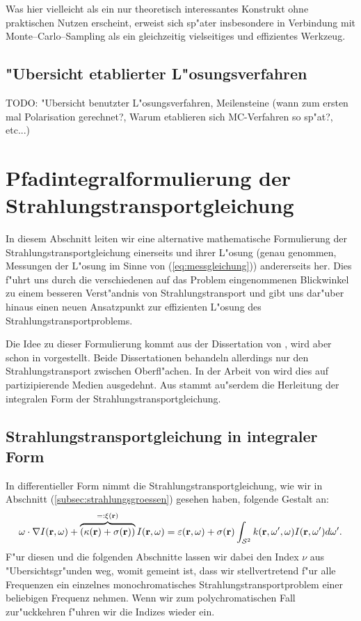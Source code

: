 	Was hier vielleicht als ein nur theoretisch interessantes Konstrukt ohne praktischen Nutzen erscheint, erweist sich sp"ater insbesondere in Verbindung mit Monte--Carlo--Sampling als ein gleichzeitig vielseitiges und effizientes Werkzeug.	
	
	
	\section{"Ubersicht etablierter L"osungsverfahren}
	TODO: "Ubersicht benutzter L"osungsverfahren, Meilensteine (wann zum ersten mal Polarisation gerechnet?, Warum etablieren sich MC-Verfahren so sp"at?, etc...)
		
	\chapter{Pfadintegralformulierung der Strahlungstransportgleichung}\label{chapter:path_radiative_transfer}
	In diesem Abschnitt leiten wir eine alternative mathematische Formulierung der Strahlungstransportgleichung einerseits und ihrer L"osung (genau genommen, Messungen der L"osung im Sinne von (\ref{eq:messgleichung})) andererseits her. Dies f"uhrt uns durch die verschiedenen auf das Problem eingenommenen Blickwinkel zu einem besseren Verst"andnis von Strahlungstransport und gibt uns dar"uber hinaus einen neuen Ansatzpunkt zur effizienten L"osung des Strahlungstransportproblems.
	
	Die Idee zu dieser Formulierung kommt aus der Dissertation von \citet{Veach:1997p9136}, wird aber schon in \citep{Arvo:1995p9257} vorgestellt. Beide Dissertationen behandeln allerdings nur den Strahlungstransport zwischen Oberfl"achen. In der Arbeit von \citet{Pauly:2000p5705} wird dies auf partizipierende Medien ausgedehnt. Aus \citep{Arvo:1993p9035} stammt au"serdem die Herleitung der integralen Form der Strahlungstransportgleichung.
	
	
	\section{Strahlungstransportgleichung in integraler Form}
	In differentieller Form nimmt die Strahlungstransportgleichung, wie wir in Abschnitt (\ref{subsec:strahlungsgroessen}) gesehen haben, folgende Gestalt an:
		\begin{equation}
			\omega \cdot \nabla I(\mathbf{r},\omega)+\overbrace{\left(\kappa(\mathbf{r})+\sigma(\mathbf{r})\right)}^{=:\xi(\mathbf{r})}I(\mathbf{r},\omega)=\varepsilon(\mathbf{r},\omega)+\sigma(\mathbf{r}) \int_{\mathcal{S}^2} k(\mathbf{r},\omega',\omega)I(\mathbf{r},\omega') d\omega'.
			\label{eq:diff.STG}
		\end{equation}
	F"ur diesen und die folgenden Abschnitte lassen wir dabei den Index $\nu$ aus "Ubersichtsgr"unden weg, womit gemeint ist, dass wir stellvertretend f"ur alle Frequenzen ein einzelnes monochromatisches Strahlungstransportproblem einer beliebigen Frequenz nehmen. Wenn wir zum polychromatischen Fall zur"uckkehren f"uhren wir die Indizes wieder ein.
	
